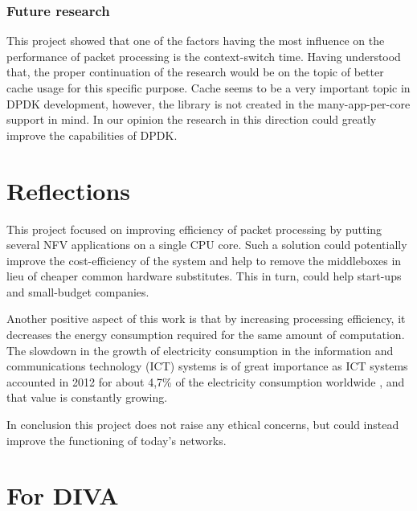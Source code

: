 \documentclass[english]{kththesis}
\newcommand\blankpage{%
    \null
    \thispagestyle{empty}%
    \addtocounter{page}{-1}%
    \newpage}
\begin{document}
\subsubsection{Future research}

This project showed that one of the factors having the most influence on the performance of packet processing is the context-switch time. Having understood that, the proper continuation of the research would be on the topic of better cache usage for this specific purpose. Cache seems to be a very important topic in DPDK development, however, the library is not created in the many-app-per-core support in mind. In our opinion the research in this direction could greatly improve the capabilities of DPDK.

\section{Reflections}
This project focused on improving efficiency of packet processing by putting several NFV applications on a single CPU core. Such a solution could potentially improve the cost-efficiency of the system and help to remove the middleboxes in lieu of cheaper common hardware substitutes. This in turn, could help start-ups and small-budget companies.

Another positive aspect of this work is that by increasing processing efficiency, it decreases the energy consumption required for the same amount of computation. The slowdown in the growth of electricity consumption in the information and communications technology (ICT) systems is of great importance as ICT systems accounted in 2012 for about 4,7\% of the electricity consumption worldwide \cite{energy_consumption}, and that value is constantly growing.

In conclusion this project does not raise any ethical concerns, but could instead improve the functioning of today's networks. 


\cleardoublepage

\renewcommand{\bibname}{References}



\label{pg:lastPageofMainmatter}
\afterpage{\blankpage}

\clearpage
\section*{For DIVA}
\end{document}
